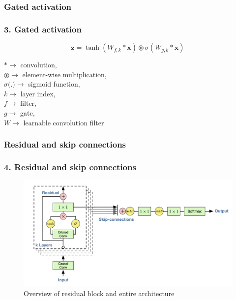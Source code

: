 \documentclass{beamer}
\begin{document}
  \subsubsection{Gated activation}
  \begin{frame}
    \frametitle{3. Gated activation}
    \centering
    \begin{equation*}
      \mathbf{z} = \tanh(W_{f, k}*\mathbf{x}) \circledast \sigma (W_{g, k}*\mathbf{x})
    \end{equation*}
    \begin{flushleft}
    $* \rightarrow$ convolution,\\
    $\circledast \rightarrow$ element-wise multiplication,\\
    $\sigma\text{(.)} \rightarrow$ sigmoid function,\\
    $k \rightarrow$ layer index,\\
    $f \rightarrow$ filter,\\
    $g \rightarrow$ gate,\\
    $W \rightarrow$ learnable convolution filter
    \end{flushleft}
  \end{frame}

  \subsubsection{Residual and skip connections}
  \begin{frame}
    \frametitle{4. Residual and skip connections}
    \begin{figure}[ht]
      \includegraphics[width=\textwidth]{images/wavenet_arch_residual.png}
      \caption{Overview of residual block and entire architecture }
    \end{figure}
  \end{frame}
\end{document}
